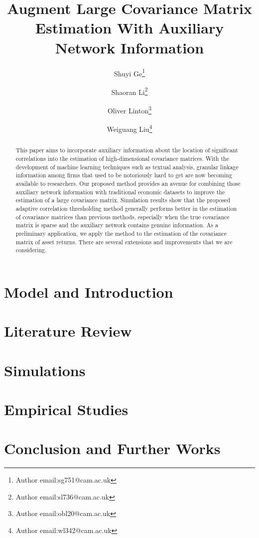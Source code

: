 \documentclass[12pt]{article}
\begin{document}
    \title{Augment Large Covariance Matrix Estimation With Auxiliary Network Information}
    \author[]{Shuyi Ge\thanks{Author email:sg751@cam.ac.uk}}
    \author[]{Shaoran Li\thanks{Author email:sl736@cam.ac.uk}}
    \author[]{Oliver Linton\thanks{Author email:obl20@cam.ac.uk}}
    \author[]{Weiguang Liu\thanks{Author email:wl342@cam.ac.uk}}
    \maketitle
    
    \begin{abstract}
        This paper aims to incorporate auxiliary information about the location of significant correlations into the estimation of high-dimensional covariance matrices. With the development of machine learning techniques such as textual analysis, granular linkage information among firms that used to be notoriously hard to get are now becoming available to researchers. Our proposed method provides an avenue for combining those auxiliary network information with traditional economic datasets to improve the estimation of a large covariance matrix. Simulation results show that the proposed adaptive correlation thresholding method generally performs better in the estimation of covariance matrices than previous methods, especially when the true covariance matrix is sparse and the auxiliary network contains genuine information. As a preliminary application, we apply the method to the estimation of the covariance matrix of asset returns. There are several extensions and improvements that we are considering.     
    \end{abstract}
    
    \section{Model and Introduction}
    \section{Literature Review}
    \section{Simulations} 
    \section{Empirical Studies}
    \section{Conclusion and Further Works}

\printbibliography
\end{document}
